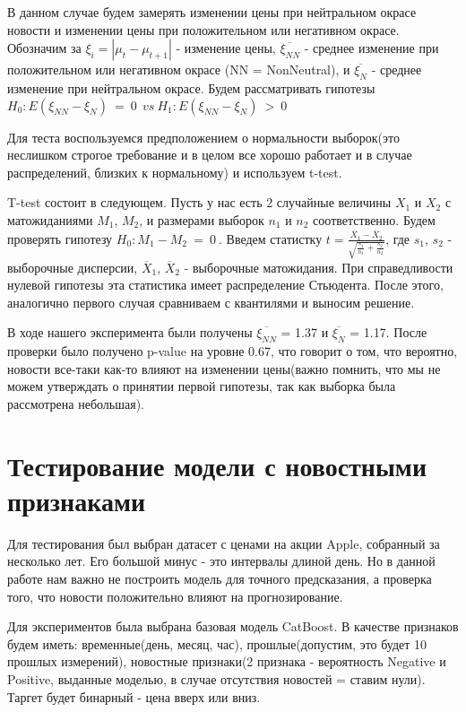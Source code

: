 \documentclass{article}
\begin{document}
В данном случае будем замерять изменении цены при нейтральном окрасе новости и изменении цены при положительном или негативном окрасе. Обозначим за $\xi _{i} =|\mu _{t} -\mu _{t+1}|$ - изменение цены, $\overline{\xi _{NN}}$ - среднее изменение при положительном или негативном окрасе (NN = NonNeutral), и $\overline{\xi _{N}}$ - среднее изменение при нейтральном окрасе.
Будем рассматривать гипотезы $H_{0} :E( \xi _{NN} -\xi _{N}) \ =\ 0\ \ vs\ H_{1} :E( \xi _{NN} -\xi _{N}) \  >\ 0$

Для теста воспользуемся предположением о нормальности выборок(это неслишком строгое требование и в целом все хорошо работает и в случае распределений, близких к нормальному) и используем t-test.

T-test состоит в следующем. Пусть у нас есть 2 случайные величины $X_{1}$ и $X_{2}$ с матожиданиями $M_{1}$, $M_{2}$, и размерами выборок $n_{1}$ и $n_{2}$ соответственно. Будем проверять гипотезу $H_{0} : M_{1} - M_{2}  \ =\ 0\ $. Введем статистку $t=\frac{\overline{X}_{1} -\overline{X}_{2}}{\sqrt{\frac{s_{1}}{n_{1}} +\frac{s_{2}}{n_{2}}}}$, где $s_{1}$, $s_{2}$ - выборочные дисперсии, $\overline{X}_{1}$, $\overline{X}_{2}$ - выборочные матожидания. При справедливости нулевой гипотезы эта статистика имеет распределение Стьюдента. После этого, аналогично первого случая сравниваем с квантилями и выносим решение.

В ходе нашего эксперимента были получены $\overline{\xi _{NN}}$ = 1.37 и $\overline{\xi _{N}}$ = 1.17. После проверки было получено p-value на уровне 0.67, что говорит о том, что вероятно, новости все-таки как-то влияют на изменении цены(важно помнить, что мы не можем утверждать о принятии первой гипотезы, так как выборка была рассмотрена небольшая).

\section{Тестирование модели с новостными признаками}
Для тестирования был выбран датасет с ценами на акции Apple, собранный за несколько лет. Его большой минус - это интервалы длиной день. Но в данной работе нам важно не построить модель для точного предсказания, а проверка того, что новости положительно влияют на прогнозирование.


Для экспериментов была выбрана базовая модель CatBoost. В качестве признаков будем иметь: временные(день, месяц, час), прошлые(допустим, это будет 10 прошлых измерений), новостные признаки(2 признака - вероятность Negative и Positive, выданные моделью, в случае отсутствия новостей = ставим нули). Таргет будет бинарный - цена вверх или вниз.
\end{document}
